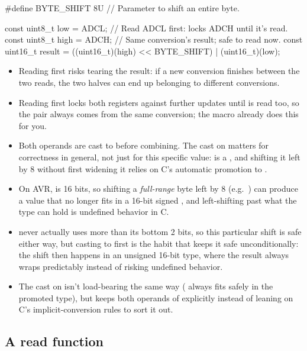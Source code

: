 \begin{enumerate}
\begin{ccode}
#define BYTE_SHIFT 8U // Parameter to shift an entire byte.

const uint8_t low = ADCL;  // Read ADCL first: locks ADCH until it's read.
const uint8_t high = ADCH; // Same conversion's result; safe to read now.
const uint16_t result = ((uint16_t)(high) << BYTE_SHIFT) | (uint16_t)(low);
\end{ccode}
\end{enumerate}

\note
\begin{itemize}
  \item Reading  first risks tearing the result: if a new conversion finishes between
    the two reads, the two halves can end up belonging to different conversions.
  \item Reading  first locks both registers against further updates until 
    is read too, so the pair always comes from the same conversion; the  macro already
    does this for you.
  \item Both operands are cast to  before combining. The cast on  matters
    for correctness in general, not just for this specific value:  is a ,
    and shifting it left by 8 without first widening it relies on C's automatic promotion to
    .
  \item On AVR,  is 16 bits, so shifting a \emph{full-range} byte left by 8 (e.g.\
    ) can produce a value that no longer fits in a 16-bit signed
    \code{int}, and left-shifting past what the type can hold is undefined behavior in C.
  \item \code{ADCH} never actually uses more than its bottom 2 bits, so this particular shift is
    safe either way, but casting to \code{uint16_t} first is the habit that keeps it safe
    unconditionally: the shift then happens in an unsigned 16-bit type, where the result always
    wraps predictably instead of risking undefined behavior.
  \item The cast on  isn't load-bearing the same way ( always fits safely
    in the promoted type), but keeps both operands of \code{|} explicitly \code{uint16_t} instead
    of leaning on C's implicit-conversion rules to sort it out.
\end{itemize}

\subsection{A read function}
\label{c4:a:3}

